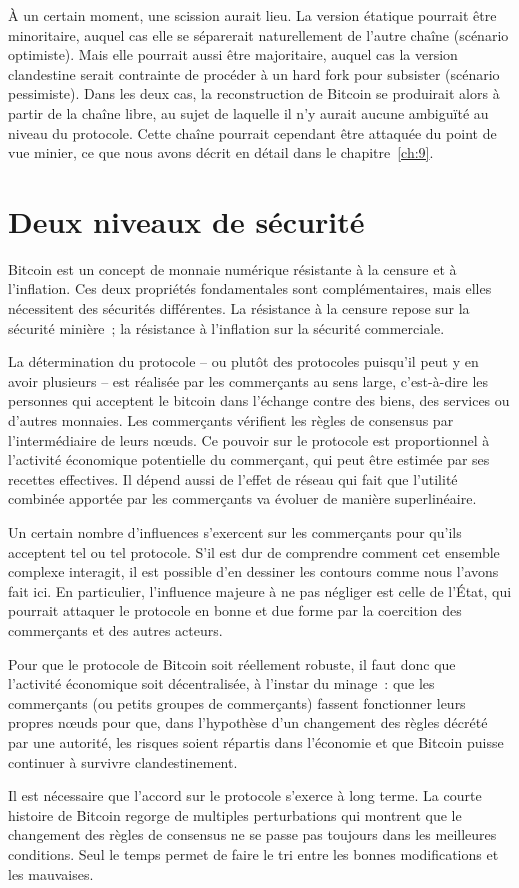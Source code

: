 À un certain moment, une scission aurait lieu. La version étatique pourrait être minoritaire, auquel cas elle se séparerait naturellement de l'autre chaîne (scénario optimiste). Mais elle pourrait aussi être majoritaire, auquel cas la version clandestine serait contrainte de procéder à un hard fork pour subsister (scénario pessimiste). Dans les deux cas, la reconstruction de Bitcoin se produirait alors à partir de la chaîne libre, au sujet de laquelle il n'y aurait aucune ambiguïté au niveau du protocole. Cette chaîne pourrait cependant être attaquée du point de vue minier, ce que nous avons décrit en détail dans le chapitre~\ref{ch:9}.

\section*{Deux niveaux de sécurité}

Bitcoin est un concept de monnaie numérique résistante à la censure et à l'inflation. Ces deux propriétés fondamentales sont complémentaires, mais elles nécessitent des sécurités différentes. La résistance à la censure repose sur la sécurité minière~; la résistance à l'inflation sur la sécurité commerciale.

La détermination du protocole -- ou plutôt des protocoles puisqu'il peut y en avoir plusieurs -- est réalisée par les commerçants au sens large, c'est-à-dire les personnes qui acceptent le bitcoin dans l'échange contre des biens, des services ou d'autres monnaies. Les commerçants vérifient les règles de consensus par l'intermédiaire de leurs nœuds. Ce pouvoir sur le protocole est proportionnel à l'activité économique potentielle du commerçant, qui peut être estimée par ses recettes effectives. Il dépend aussi de l'effet de réseau qui fait que l'utilité combinée apportée par les commerçants va évoluer de manière superlinéaire.

Un certain nombre d'influences s'exercent sur les commerçants pour qu'ils acceptent tel ou tel protocole. S'il est dur de comprendre comment cet ensemble complexe interagit, il est possible d'en dessiner les contours comme nous l'avons fait ici. En particulier, l'influence majeure à ne pas négliger est celle de l'État, qui pourrait attaquer le protocole en bonne et due forme par la coercition des commerçants et des autres acteurs.

Pour que le protocole de Bitcoin soit réellement robuste, il faut donc que l'activité économique soit décentralisée, à l'instar du minage~: que les commerçants (ou petits groupes de commerçants) fassent fonctionner leurs propres nœuds pour que, dans l'hypothèse d'un changement des règles décrété par une autorité, les risques soient répartis dans l'économie et que Bitcoin puisse continuer à survivre clandestinement.

Il est nécessaire que l'accord sur le protocole s'exerce à long terme. La courte histoire de Bitcoin regorge de multiples perturbations qui montrent que le changement des règles de consensus ne se passe pas toujours dans les meilleures conditions. Seul le temps permet de faire le tri entre les bonnes modifications et les mauvaises.
